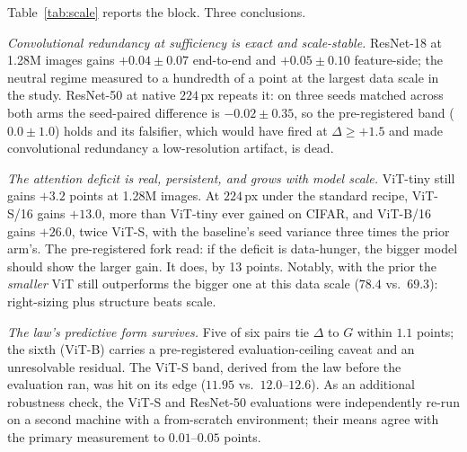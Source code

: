 Table~\ref{tab:scale} reports the block. Three conclusions.

\emph{Convolutional redundancy at sufficiency is exact and scale-stable.}
ResNet-18 at 1.28M images gains $+0.04 \pm 0.07$ end-to-end and
$+0.05 \pm 0.10$ feature-side; the neutral regime measured to a hundredth
of a point at the largest data scale in the study. ResNet-50 at native
$224$\,px repeats it: on three seeds matched across both arms the
seed-paired difference is $-0.02 \pm 0.35$, so the pre-registered band
($0.0 \pm 1.0$) holds and its falsifier, which would have fired at
$\Delta \geq +1.5$ and made convolutional redundancy a low-resolution
artifact, is dead.

\emph{The attention deficit is real, persistent, and grows with model
scale.} ViT-tiny still gains $+3.2$ points at 1.28M images. At $224$\,px
under the standard recipe, ViT-S/16 gains $+13.0$, more than ViT-tiny
ever gained on CIFAR, and ViT-B/16 gains $+26.0$, twice ViT-S, with the
baseline's seed variance three times the prior arm's. The pre-registered
fork read: if the deficit is data-hunger, the bigger model should show
the larger gain. It does, by 13 points. Notably, with the prior the
\emph{smaller} ViT still outperforms the bigger one at this data scale
($78.4$ vs.\ $69.3$): right-sizing plus structure beats scale.

\emph{The law's predictive form survives.} Five of six pairs tie
$\Delta$ to $G$ within $1.1$ points; the sixth (ViT-B) carries a
pre-registered evaluation-ceiling caveat and an unresolvable residual. The
ViT-S band, derived from the law before the evaluation ran, was hit on its
edge ($11.95$ vs.\ $12.0$--$12.6$). As an additional robustness check,
the ViT-S and ResNet-50 evaluations were independently re-run on a second
machine with a from-scratch environment; their means agree with the
primary measurement to $0.01$--$0.05$ points.
